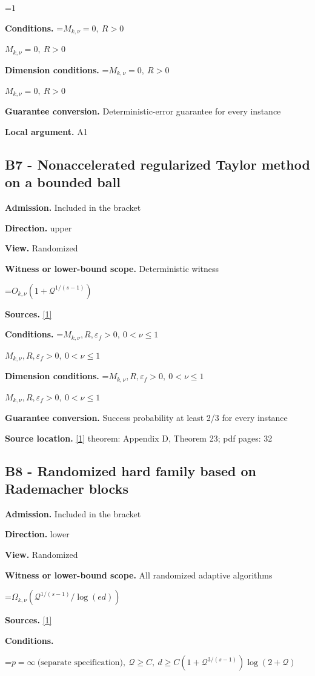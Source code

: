 \documentclass[10pt,a4paper]{article}
\newcommand{\AtlasMath}[1]{\par\begingroup\centering\setbox0=\hbox{$\displaystyle #1$}\ifdim\wd0>1.4\linewidth\typeout{ATLAS WIDE FORMULA: \the\wd0}\fi\ifdim\wd0>\linewidth\resizebox{\linewidth}{!}{\box0}\else\box0\fi\par\endgroup}
\newcommand{\AtlasInlineMath}[1]{\begingroup\setbox0=\hbox{$#1$}\ifdim\wd0>.4\linewidth\endgroup\AtlasMath{#1}\else\endgroup$#1$\fi}
\begin{document}
\AtlasMath{1}
\textbf{Conditions.} \AtlasInlineMath{M_{k,\nu}=0,\ R>0}

\textbf{Dimension conditions.} \AtlasInlineMath{M_{k,\nu}=0,\ R>0}

\textbf{Guarantee conversion.} Deterministic-error guarantee for every instance

\textbf{Local argument.} A1

\subsection{B7 - Nonaccelerated regularized Taylor method on a bounded ball}
\textbf{Admission.} Included in the bracket

\textbf{Direction.} upper

\textbf{View.} Randomized

\textbf{Witness or lower-bound scope.} Deterministic witness

\AtlasMath{O_{k,\nu}(1+\mathcal{Q}^{1/(s-1)})}
\textbf{Sources.} \href{https://arxiv.org/pdf/2411.08987v2}{[1]}

\textbf{Conditions.} \AtlasInlineMath{M_{k,\nu},R,\varepsilon_f>0,\ 0<\nu\le1}

\textbf{Dimension conditions.} \AtlasInlineMath{M_{k,\nu},R,\varepsilon_f>0,\ 0<\nu\le1}

\textbf{Guarantee conversion.} Success probability at least 2/3 for every instance

\textbf{Source location.} \href{https://arxiv.org/pdf/2411.08987v2}{[1]} theorem: Appendix D, Theorem 23; pdf pages: 32

\subsection{B8 - Randomized hard family based on Rademacher blocks}
\textbf{Admission.} Included in the bracket

\textbf{Direction.} lower

\textbf{View.} Randomized

\textbf{Witness or lower-bound scope.} All randomized adaptive algorithms

\AtlasMath{\Omega_{k,\nu}(\mathcal{Q}^{1/(s-1)}/\log(ed))}
\textbf{Sources.} \href{https://arxiv.org/pdf/2411.08987v2}{[1]}

\textbf{Conditions.} 
\AtlasMath{p=\infty\ \text{(separate specification)},\ \mathcal{Q}\ge C,\ d\ge C(1+\mathcal{Q}^{3/(s-1)})\log(2+\mathcal{Q})}
\end{document}

